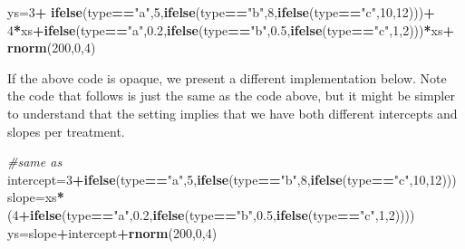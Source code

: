 \documentclass[
]{book}
\newenvironment{Shaded}{\begin{snugshade}}{\end{snugshade}}
\newcommand{\CommentTok}[1]{\textcolor[rgb]{0.56,0.35,0.01}{\textit{#1}}}
\newcommand{\DecValTok}[1]{\textcolor[rgb]{0.00,0.00,0.81}{#1}}
\newcommand{\FloatTok}[1]{\textcolor[rgb]{0.00,0.00,0.81}{#1}}
\newcommand{\FunctionTok}[1]{\textcolor[rgb]{0.13,0.29,0.53}{\textbf{#1}}}
\newcommand{\NormalTok}[1]{#1}
\newcommand{\OtherTok}[1]{\textcolor[rgb]{0.56,0.35,0.01}{#1}}
\newcommand{\SpecialCharTok}[1]{\textcolor[rgb]{0.81,0.36,0.00}{\textbf{#1}}}
\newcommand{\StringTok}[1]{\textcolor[rgb]{0.31,0.60,0.02}{#1}}
\begin{document}
\begin{Shaded}
\begin{Highlighting}[]
\NormalTok{ys}\OtherTok{=}\DecValTok{3}\SpecialCharTok{+}
\FunctionTok{ifelse}\NormalTok{(type}\SpecialCharTok{==}\StringTok{"a"}\NormalTok{,}\DecValTok{5}\NormalTok{,}\FunctionTok{ifelse}\NormalTok{(type}\SpecialCharTok{==}\StringTok{"b"}\NormalTok{,}\DecValTok{8}\NormalTok{,}\FunctionTok{ifelse}\NormalTok{(type}\SpecialCharTok{==}\StringTok{"c"}\NormalTok{,}\DecValTok{10}\NormalTok{,}\DecValTok{12}\NormalTok{)))}\SpecialCharTok{+}
\DecValTok{4}\SpecialCharTok{*}\NormalTok{xs}\SpecialCharTok{+}\FunctionTok{ifelse}\NormalTok{(type}\SpecialCharTok{==}\StringTok{"a"}\NormalTok{,}\FloatTok{0.2}\NormalTok{,}\FunctionTok{ifelse}\NormalTok{(type}\SpecialCharTok{==}\StringTok{"b"}\NormalTok{,}\FloatTok{0.5}\NormalTok{,}\FunctionTok{ifelse}\NormalTok{(type}\SpecialCharTok{==}\StringTok{"c"}\NormalTok{,}\DecValTok{1}\NormalTok{,}\DecValTok{2}\NormalTok{)))}\SpecialCharTok{*}\NormalTok{xs}\SpecialCharTok{+}
\FunctionTok{rnorm}\NormalTok{(}\DecValTok{200}\NormalTok{,}\DecValTok{0}\NormalTok{,}\DecValTok{4}\NormalTok{)}
\end{Highlighting}
\end{Shaded}

If the above code is opaque, we present a different implementation below. Note the code that follows is just the same as the code above, but it might be simpler to understand that the setting implies that we have both different intercepts and slopes per treatment.

\begin{Shaded}
\begin{Highlighting}[]
\CommentTok{\#same as}
\NormalTok{intercept}\OtherTok{=}\DecValTok{3}\SpecialCharTok{+}\FunctionTok{ifelse}\NormalTok{(type}\SpecialCharTok{==}\StringTok{"a"}\NormalTok{,}\DecValTok{5}\NormalTok{,}\FunctionTok{ifelse}\NormalTok{(type}\SpecialCharTok{==}\StringTok{"b"}\NormalTok{,}\DecValTok{8}\NormalTok{,}\FunctionTok{ifelse}\NormalTok{(type}\SpecialCharTok{==}\StringTok{"c"}\NormalTok{,}\DecValTok{10}\NormalTok{,}\DecValTok{12}\NormalTok{)))}
\NormalTok{slope}\OtherTok{=}\NormalTok{xs}\SpecialCharTok{*}\NormalTok{(}\DecValTok{4}\SpecialCharTok{+}\FunctionTok{ifelse}\NormalTok{(type}\SpecialCharTok{==}\StringTok{"a"}\NormalTok{,}\FloatTok{0.2}\NormalTok{,}\FunctionTok{ifelse}\NormalTok{(type}\SpecialCharTok{==}\StringTok{"b"}\NormalTok{,}\FloatTok{0.5}\NormalTok{,}\FunctionTok{ifelse}\NormalTok{(type}\SpecialCharTok{==}\StringTok{"c"}\NormalTok{,}\DecValTok{1}\NormalTok{,}\DecValTok{2}\NormalTok{))))}
\NormalTok{ys}\OtherTok{=}\NormalTok{slope}\SpecialCharTok{+}\NormalTok{intercept}\SpecialCharTok{+}\FunctionTok{rnorm}\NormalTok{(}\DecValTok{200}\NormalTok{,}\DecValTok{0}\NormalTok{,}\DecValTok{4}\NormalTok{)}
\end{Highlighting}
\end{Shaded}
\end{document}
